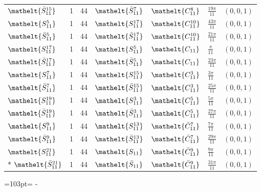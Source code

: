 \documentclass[10pt,a4paper]{article}
\newcommand{\needspace}[1]{\par\penalty-100\begingroup\dimen0=#1\relax\dimen2=\pagegoal
  \advance\dimen2-\pagetotal\ifdim\dimen0>\dimen2\relax\ifdim\dimen2>0pt\vfil\break\fi\fi
  \endgroup}
\numberwithin{equation}{section}
\newcommand{\eltfont}[1]{{\let\sigma\eltsigma\mathelt{#1}}}
\newcommand{\cls}[1]{\eltfont{#1}}
\newcommand{\dirvec}[3]{(#1, #2, #3)}
\newcommand{\barred}[1]{\bar{#1}}
\begin{document}
{\begin{longtable}{@{}lrrllll@{}}
$\cls{\barred{S}_{11}^{15}}$ & 1 & 44 & $\cls{\barred{S}_{11}^{7}}$ & $\cls{C_{11}^{8}}$ & $\tfrac{19\pi}{11}$ & $\dirvec{0}{0}{1}$\\
$\cls{S_{11}^{5}}$ & 1 & 44 & $\cls{S_{11}^{17}}$ & $\cls{C_{11}^{10}}$ & $\tfrac{43\pi}{11}$ & $\dirvec{0}{0}{1}$\\
$\cls{\barred{S}_{11}^{5}}$ & 1 & 44 & $\cls{\barred{S}_{11}^{17}}$ & $\cls{C_{11}^{10}}$ & $\tfrac{21\pi}{11}$ & $\dirvec{0}{0}{1}$\\
$\cls{S_{11}^{17}}$ & 1 & 44 & $\cls{S_{11}^{5}}$ & $\cls{C_{11}}$ & $\tfrac{\pi}{11}$ & $\dirvec{0}{0}{1}$\\
$\cls{\barred{S}_{11}^{17}}$ & 1 & 44 & $\cls{\barred{S}_{11}^{5}}$ & $\cls{C_{11}}$ & $\tfrac{23\pi}{11}$ & $\dirvec{0}{0}{1}$\\
$\cls{S_{11}^{7}}$ & 1 & 44 & $\cls{S_{11}^{15}}$ & $\cls{C_{11}^{3}}$ & $\tfrac{3\pi}{11}$ & $\dirvec{0}{0}{1}$\\
$\cls{\barred{S}_{11}^{7}}$ & 1 & 44 & $\cls{\barred{S}_{11}^{15}}$ & $\cls{C_{11}^{3}}$ & $\tfrac{25\pi}{11}$ & $\dirvec{0}{0}{1}$\\
$\cls{S_{11}^{19}}$ & 1 & 44 & $\cls{S_{11}^{3}}$ & $\cls{C_{11}^{5}}$ & $\tfrac{5\pi}{11}$ & $\dirvec{0}{0}{1}$\\
$\cls{\barred{S}_{11}^{19}}$ & 1 & 44 & $\cls{\barred{S}_{11}^{3}}$ & $\cls{C_{11}^{5}}$ & $\tfrac{27\pi}{11}$ & $\dirvec{0}{0}{1}$\\
$\cls{S_{11}^{9}}$ & 1 & 44 & $\cls{S_{11}^{13}}$ & $\cls{\barred{C}_{11}^{7}}$ & $\tfrac{7\pi}{11}$ & $\dirvec{0}{0}{1}$\\
$\cls{\barred{S}_{11}^{9}}$ & 1 & 44 & $\cls{\barred{S}_{11}^{13}}$ & $\cls{\barred{C}_{11}^{7}}$ & $\tfrac{29\pi}{11}$ & $\dirvec{0}{0}{1}$\\
$\cls{S_{11}^{21}}$ & 1 & 44 & $\cls{S_{11}}$ & $\cls{\barred{C}_{11}^{9}}$ & $\tfrac{9\pi}{11}$ & $\dirvec{0}{0}{1}$\\*
$\cls{\barred{S}_{11}^{21}}$ & 1 & 44 & $\cls{\barred{S}_{11}}$ & $\cls{\barred{C}_{11}^{9}}$ & $\tfrac{31\pi}{11}$ & $\dirvec{0}{0}{1}$\\
\bottomrule\end{longtable}}
\needspace{103pt}
\end{document}

